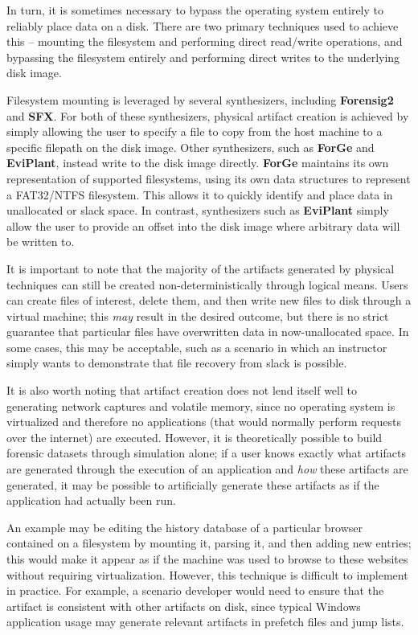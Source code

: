 \documentclass[letterpaper,12pt]{report}
\begin{document}
In turn, it is sometimes necessary to bypass the operating system
entirely to reliably place data on a disk. There are two primary
techniques used to achieve this -- mounting the filesystem and
performing direct read/write operations, and bypassing the filesystem
entirely and performing direct writes to the underlying disk image.

Filesystem mounting is leveraged by several synthesizers, including
\textbf{Forensig2} and \textbf{SFX}. For both of these synthesizers,
physical artifact creation is achieved by simply allowing the user to
specify a file to copy from the host machine to a specific filepath on
the disk image. Other synthesizers, such as \textbf{ForGe} and
\textbf{EviPlant}, instead write to the disk image directly.
\textbf{ForGe} maintains its own representation of supported
filesystems, using its own data structures to represent a FAT32/NTFS
filesystem. This allows it to quickly identify and place data in
unallocated or slack space. In contrast, synthesizers such as
\textbf{EviPlant} simply allow the user to provide an offset into the
disk image where arbitrary data will be written to.

It is important to note that the majority of the artifacts generated by
physical techniques can still be created non-deterministically through
logical means. Users can create files of interest, delete them, and then
write new files to disk through a virtual machine; this \emph{may}
result in the desired outcome, but there is no strict guarantee that
particular files have overwritten data in now-unallocated space. In some
cases, this may be acceptable, such as a scenario in which an instructor
simply wants to demonstrate that file recovery from slack is possible.

It is also worth noting that artifact creation does not lend itself well
to generating network captures and volatile memory, since no operating
system is virtualized and therefore no applications (that would normally
perform requests over the internet) are executed. However, it is
theoretically possible to build forensic datasets through simulation
alone; if a user knows exactly what artifacts are generated through the
execution of an application and \emph{how} these artifacts are
generated, it may be possible to artificially generate these artifacts
as if the application had actually been run.

An example may be editing the history database of a particular browser
contained on a filesystem by mounting it, parsing it, and then adding
new entries; this would make it appear as if the machine was used to
browse to these websites without requiring virtualization. However, this
technique is difficult to implement in practice. For example, a scenario
developer would need to ensure that the artifact is consistent with
other artifacts on disk, since typical Windows application usage may
generate relevant artifacts in prefetch files and jump lists.
\end{document}

